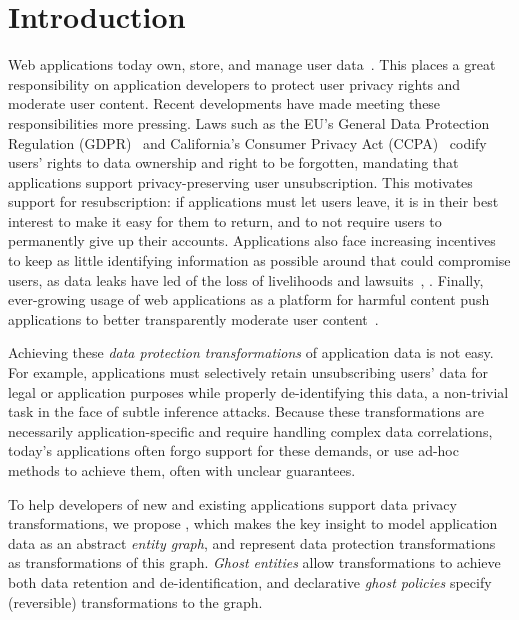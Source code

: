 \section{Introduction}
Web applications today own, store, and manage user data~\cite{nytimes:fb, npr:data}. 
This places a great responsibility on application developers to protect user privacy rights
and moderate user content.
%
Recent developments have made meeting these responsibilities more pressing.  Laws such as the EU's
General Data Protection Regulation (GDPR)~\cite{eu:gdpr} and California's Consumer Privacy Act
(CCPA)~\cite{ca:privacy-act} codify users' rights to data ownership and right to be forgotten,
mandating that applications support privacy-preserving user unsubscription. This motivates support
for resubscription: if applications must let users leave, it is in their best interest to make it
easy for them to return, and to not require users to permanently give up their accounts.
%
Applications also face increasing incentives to keep as little identifying information as possible
around that could compromise users, as data leaks have led of the loss of livelihoods and
lawsuits~\cite{breach:amazon,breach:twitter, breach:fb, breach:marriott, breach:quora}, .
%
Finally, ever-growing usage of web applications as a platform for harmful content push 
applications to better transparently moderate user content~\cite{contentmod, sasb}.

Achieving these \emph{data protection transformations} of application data is not easy.
For example, applications must selectively retain unsubscribing users' data for legal or application purposes while properly
de-identifying this data, a non-trivial task in the face of subtle inference attacks.
Because these transformations are necessarily application-specific and require handling complex data
correlations, today's applications often forgo support for these demands, or use ad-hoc methods to
achieve them, often with unclear guarantees.

To help developers of new and existing applications support data privacy transformations, we propose
\sys, which makes the key insight to model application data as an abstract \emph{entity graph}, and
represent data protection transformations as transformations of this graph. \emph{Ghost entities}
allow transformations to achieve both data retention and de-identification, and declarative
\emph{ghost policies} specify (reversible) transformations to the graph.

